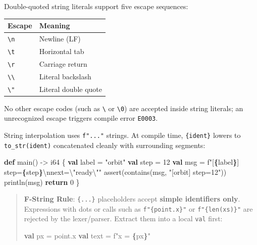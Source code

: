 \documentclass[
  english,
  oneside]{book}
\newenvironment{Shaded}{\begin{snugshade}}{\end{snugshade}}
\newcommand{\ControlFlowTok}[1]{\textcolor[rgb]{0.77,0.53,0.75}{\textbf{#1}}}
\newcommand{\DataTypeTok}[1]{\textcolor[rgb]{0.31,0.79,0.69}{#1}}
\newcommand{\DecValTok}[1]{\textcolor[rgb]{0.71,0.81,0.66}{#1}}
\newcommand{\FunctionTok}[1]{\textcolor[rgb]{0.86,0.86,0.67}{#1}}
\newcommand{\KeywordTok}[1]{\textcolor[rgb]{0.34,0.61,0.84}{\textbf{#1}}}
\newcommand{\NormalTok}[1]{\textcolor[rgb]{0.83,0.83,0.83}{#1}}
\newcommand{\OperatorTok}[1]{\textcolor[rgb]{0.83,0.83,0.83}{#1}}
\newcommand{\StringTok}[1]{\textcolor[rgb]{0.81,0.57,0.47}{#1}}
\newcounter{none} %
\begin{document}
Double-quoted string literals support five escape sequences:

{\def\LTcaptype{none} %
\begin{longtable}[]{@{}ll@{}}
\toprule\noalign{}
Escape & Meaning \\
\midrule\noalign{}
\endhead
\bottomrule\noalign{}
\endlastfoot
\texttt{\textbackslash{}n} & Newline (LF) \\
\texttt{\textbackslash{}t} & Horizontal tab \\
\texttt{\textbackslash{}r} & Carriage return \\
\texttt{\textbackslash{}\textbackslash{}} & Literal backslash \\
\texttt{\textbackslash{}"} & Literal double quote \\
\end{longtable}
}

No other escape codes (such as
\texttt{\textbackslash{}\textquotesingle{}} or
\texttt{\textbackslash{}0}) are accepted inside string literals; an
unrecognized escape triggers compile error \texttt{E0003}.

String interpolation uses \texttt{f"..."} strings. At compile time,
\texttt{\{ident\}} lowers to \texttt{to\_str(ident)} concatenated
cleanly with surrounding segments:

\begin{Shaded}
\begin{Highlighting}[]
\KeywordTok{def}\NormalTok{ main() }\OperatorTok{{-}\textgreater{}} \DataTypeTok{i64}\NormalTok{ \{}
    \KeywordTok{val}\NormalTok{ label }\OperatorTok{=} \StringTok{"orbit"}
    \KeywordTok{val}\NormalTok{ step }\OperatorTok{=} \DecValTok{12}
    \KeywordTok{val}\NormalTok{ msg }\OperatorTok{=} \StringTok{f"[}\ControlFlowTok{\{}\NormalTok{label}\ControlFlowTok{\}}\StringTok{] step=}\ControlFlowTok{\{}\NormalTok{step}\ControlFlowTok{\}}\StringTok{\textbackslash{}nnext=\textbackslash{}"}\NormalTok{ready\textbackslash{}}\StringTok{""}
    \FunctionTok{assert}\NormalTok{(}\FunctionTok{contains}\NormalTok{(msg, }\StringTok{"[orbit] step=12"}\NormalTok{))}
\NormalTok{    println(msg)}
    \ControlFlowTok{return} \DecValTok{0}
\NormalTok{\}}
\end{Highlighting}
\end{Shaded}

\begin{quote}
\textbf{F-String Rule}: \texttt{\{...\}} placeholders accept
\textbf{simple identifiers only}. Expressions with dots or calls such as
\texttt{f"\{point.x\}"} or \texttt{f"\{len(xs)\}"} are rejected by the
lexer/parser. Extract them into a local \texttt{val} first:

\begin{Shaded}
\begin{Highlighting}[]
\KeywordTok{val}\NormalTok{ px }\OperatorTok{=}\NormalTok{ point}\OperatorTok{.}\NormalTok{x}
\KeywordTok{val}\NormalTok{ text }\OperatorTok{=} \StringTok{f"x = }\ControlFlowTok{\{}\NormalTok{px}\ControlFlowTok{\}}\StringTok{"}
\end{Highlighting}
\end{Shaded}
\end{quote}
\end{document}
